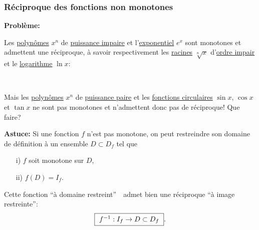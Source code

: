 
\begin{frame}[plain]
\frametitle{\bf R\'eciproque des fonctions non monotones}
\medskip 

{\bf Probl\`eme:}
\begin{itemize}
\bitem
Les \underline{polyn\^omes} $x^n$ de \underline{puissance impaire} et 
l'\underline{exponentiel} $e^x$ sont monotones et admettent 
une r\'eciproque, \`a savoir respectivement les \underline{racines} $\sqrt[n]{x}$ 
d'\underline{ordre impair} et le \underline{logarithme} $\ln{x}$: 
\begin{center}
\\ 
\end{center}
 \vspace*{1mm}

\pause
\bitem
Mais les \underline{polyn\^omes} $x^n$ de \underline{puissance paire} et  
les \underline{fonctions circulaires} $\sin x$, $\cos x$ et $\tan x$ 
ne sont pas monotones et n'admettent donc pas de r\'eciproque! 
Que faire?
\end{itemize}
\vspace*{1mm}

\pause
{\bf Astuce:}\quad 
Si une fonction $f$ n'est pas monotone, on peut restreindre 
son domaine de d\'efinition \`a un ensemble $D\subset D_f$ tel que 
\vspace*{-1mm}

\qquad
\parbox{9cm}{
\begin{itemize}
\item[i)]
$f$ soit monotone sur $D$,
\item[ii)]
$f(D)=I_f$. 
\end{itemize}}
\vspace*{-1mm}

Cette fonction ``\`a domaine restreint''\ 
\  
admet bien une r\'eciproque ``\`a image restreinte'':
$$
\mbox{\framebox{\ $f^{-1}:I_f\rightarrow D\subset D_f$\ }}. 
$$

\end{frame}


